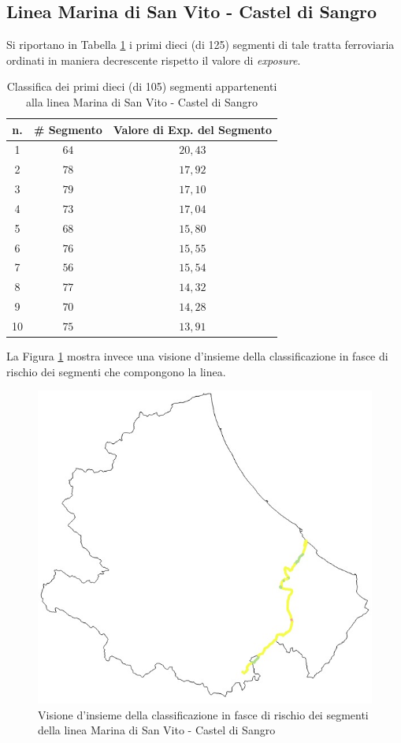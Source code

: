 \subsection{Linea Marina di San Vito - Castel di Sangro}
Si riportano in Tabella \ref{classificamarinadisanvitocasteldisangro} i primi dieci (di 125) segmenti di tale tratta ferroviaria ordinati in maniera decrescente rispetto il valore di \textit{exposure}.
\begin{table}[h]
\centering
\begin{tabular}{|c|c|c|}
\hline
\rowcolor{lightgray}
n. & \# Segmento & Valore di Exp. del Segmento \\ \hline \rowcolor{flamingopink}
1  & $64$        & $20,43$                      \\ \hline \rowcolor{icterine}
2  & $78$        & $17,92$                      \\ \hline \rowcolor{icterine}
3  & $79$        & $17,10$                      \\ \hline \rowcolor{icterine}
4  & $73$        & $17,04$                      \\ \hline \rowcolor{icterine}
5  & $68$        & $15,80$                      \\ \hline \rowcolor{icterine}
6  & $76$        & $15,55$                      \\ \hline \rowcolor{icterine}
7  & $56$       & $15,54$                      \\ \hline \rowcolor{icterine}
8  & $77$        & $14,32$                      \\ \hline \rowcolor{icterine}
9  & $70$        & $14,28$                      \\ \hline \rowcolor{icterine}
10 & $75$        & $13,91$                      \\ \hline
\end{tabular}
\caption{Classifica dei primi dieci (di 105) segmenti appartenenti alla linea Marina di San Vito - Castel di Sangro}
\label{classificamarinadisanvitocasteldisangro}
\end{table}
\newline
La Figura \ref{sanvitocasteldisangro} mostra invece una visione d'insieme della classificazione in fasce di rischio dei segmenti che compongono la linea.
\begin{figure}[hpt]
\centering
\includegraphics[width=0.4\linewidth]{img/sanvitocasteldisangro.jpeg}
\caption{Visione d'insieme della classificazione in fasce di rischio dei segmenti della linea Marina di San Vito - Castel di Sangro}
\label{sanvitocasteldisangro}
\end{figure}
